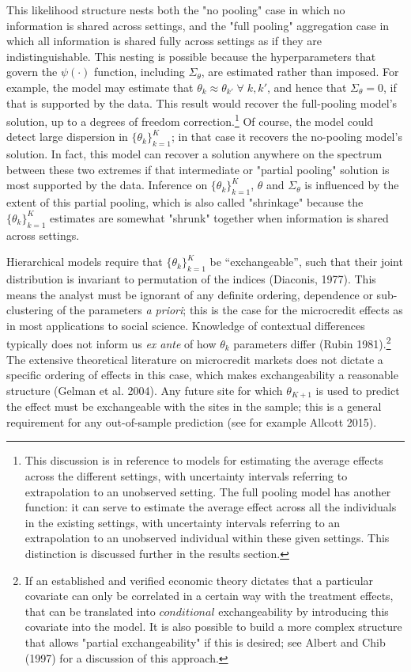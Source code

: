 \documentclass[AER]{AEA}
\begin{document}
This likelihood structure nests both the "no pooling" case in which no information is shared across settings, and the "full pooling" aggregation case in which all information is shared fully across settings as if they are indistinguishable. This nesting is possible because the hyperparameters that govern the $\psi(\cdot)$ function, including $\Sigma_{\theta}$, are estimated rather than imposed. For example, the model may estimate that $\theta_k \approx \theta_{k'} \; \forall \; k, k'$, and hence that $\Sigma_{\theta}= 0$, if that is supported by the data. This result would recover the full-pooling model's solution, up to a degrees of freedom correction.\footnote{This discussion is in reference to models for estimating the average effects across the different settings, with uncertainty intervals referring to extrapolation to an unobserved setting. The full pooling model has another function: it can serve to estimate the average effect across all the individuals in the existing settings, with uncertainty intervals referring to an extrapolation to an unobserved individual within these given settings. This distinction is discussed further in the results section.} Of course, the model could detect large dispersion in $  \{\theta_k\}_{k=1}^K$; in that case it recovers the no-pooling model's solution. In fact, this model can recover a solution anywhere on the spectrum between these two extremes if that intermediate or "partial pooling" solution is most supported by the data. Inference on $  \{\theta_k\}_{k=1}^K$, $\theta$ and $\Sigma_\theta$ is influenced by the extent of this partial pooling, which is also called "shrinkage" because the $  \{\theta_k\}_{k=1}^K$ estimates are somewhat "shrunk" together when information is shared across settings.

Hierarchical models require that $\{{\theta}_k\}_{k=1}^K $   be ``exchangeable'', such that their joint distribution is invariant to permutation of the indices (Diaconis, 1977). This means the analyst must be ignorant of any definite ordering, dependence or sub-clustering of the parameters \emph{a priori}; this is the case for the microcredit effects as in most applications to social science. Knowledge of contextual differences typically does not inform us \emph{ex ante} of how $\theta_k$ parameters differ (Rubin 1981).\footnote{If an established and verified economic theory dictates that a particular covariate can only be correlated in a certain way with the treatment effects, that can be translated into $conditional$ exchangeability by introducing this covariate into the model. It is also possible to build a more complex structure that allows "partial exchangeability" if this is desired; see Albert and Chib (1997) for a discussion of this approach.}  The extensive theoretical literature on microcredit markets does not dictate a specific ordering of effects in this case, which makes exchangeability a reasonable structure (Gelman et al. 2004). Any future site for which $\theta_{K+1}$ is used to predict the effect must be exchangeable with the sites in the sample; this is a general requirement for any out-of-sample prediction (see for example Allcott 2015).
\end{document}
